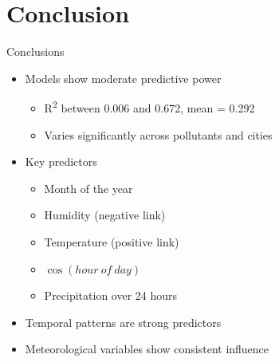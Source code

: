 \documentclass[svgnames, 12pt]{beamer}
\begin{document}

\section{Conclusion}

\begin{frame}{Conclusions}
\begin{itemize}
    \item Models show moderate predictive power
        \begin{itemize}
            \item R\textsuperscript{2} between 0.006 and 0.672, mean = 0.292
            \item Varies significantly across pollutants and cities
        \end{itemize}
    \item Key predictors
        \begin{itemize}
            \item Month of the year
            \item Humidity (negative link)
            \item Temperature (positive link)
            \item $\cos(hour\ of\ day)$
            \item Precipitation over 24 hours
        \end{itemize}
    \item Temporal patterns are strong predictors
    \item Meteorological variables show consistent influence
\end{itemize}
\end{frame}
\end{document}

